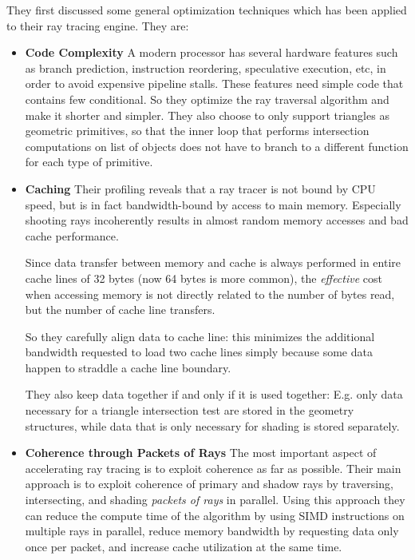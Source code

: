 They first discussed some general optimization techniques which has been applied to their ray tracing engine. They are:

\begin{itemize}
	\item \textbf{Code Complexity} A modern processor has several hardware features such as branch prediction, instruction reordering, speculative execution, etc, in order to avoid expensive pipeline stalls. These features need simple code that contains few conditional. So they optimize the ray traversal algorithm and make it shorter and simpler. They also choose to only support triangles as geometric primitives, so that the inner loop that performs intersection computations on list of objects does not have to branch to a different function for each type of primitive.
	\item \textbf{Caching} Their profiling reveals that a ray tracer is not bound by CPU speed, but is in fact bandwidth-bound by access to main memory. Especially shooting rays incoherently results in almost random memory accesses and bad cache performance.
		
		Since data transfer between memory and cache is always performed in entire cache lines of 32 bytes (now 64 bytes is more common), the \textit{effective} cost when accessing memory is not directly related to the number of bytes read, but the number of cache line transfers. 
		
		So they carefully align data to cache line: this minimizes the additional bandwidth requested to load two cache lines simply because some data happen to straddle a cache line boundary.
		
		They also keep data together if and only if it is used together: E.g. only data necessary for a triangle intersection test are stored in the geometry structures, while data that is only necessary for shading is stored separately.
	
	\item \textbf{Coherence through Packets of Rays} The most important aspect of accelerating ray tracing is to exploit coherence as far as possible. Their main approach is to exploit coherence of primary and shadow rays by traversing, intersecting, and shading \textit{packets of rays} in parallel. Using this approach they can reduce the compute time of the algorithm by using SIMD instructions on multiple rays in parallel, reduce memory bandwidth by requesting data only once per packet, and increase cache utilization at the same time.
\end{itemize}

